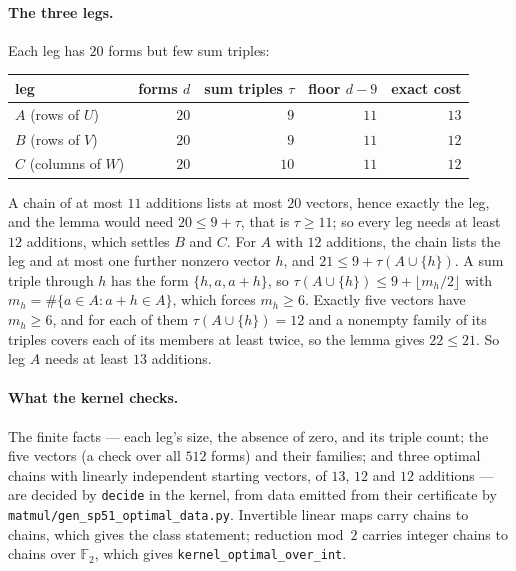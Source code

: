\documentclass[11pt]{article}
\theoremstyle{definition}
\theoremstyle{remark}
\newcommand{\F}{\mathbb{F}}
\begin{document}
\paragraph{The three legs.}  Each leg has $20$ forms but few sum
triples:

\begin{center}
\begin{tabular}{lrrrr}
\toprule
leg & forms $d$ & sum triples $\tau$ & floor $d-9$ & exact cost\\
\midrule
$A$ (rows of $U$) & $20$ & $9$ & $11$ & $13$\\
$B$ (rows of $V$) & $20$ & $9$ & $11$ & $12$\\
$C$ (columns of $W$) & $20$ & $10$ & $11$ & $12$\\
\bottomrule
\end{tabular}
\end{center}

\noindent
A chain of at most $11$ additions lists at most $20$ vectors, hence
exactly the leg, and the lemma would need $20\le 9+\tau$, that is
$\tau\ge 11$; so every leg needs at least $12$ additions, which settles
$B$ and $C$.  For $A$ with $12$ additions, the chain lists the leg and
at most one further nonzero vector $h$, and $21\le 9+\tau(A\cup\{h\})$.
A sum triple through $h$ has the form $\{h,a,a+h\}$, so
$\tau(A\cup\{h\}) \le 9 + \lfloor m_h/2\rfloor$ with
$m_h=\#\{a\in A : a+h\in A\}$, which forces $m_h\ge 6$.  Exactly five
vectors have $m_h\ge 6$, and for each of them $\tau(A\cup\{h\})=12$ and
a nonempty family of its triples covers each of its members at least
twice, so the lemma gives $22\le 21$.  So leg $A$ needs at least $13$ additions.

\paragraph{What the kernel checks.}  The finite facts --- each leg's
size, the absence of zero, and its triple count; the five vectors (a
check over all $512$ forms) and their families; and three optimal chains
with linearly independent starting vectors, of $13$, $12$ and $12$
additions --- are decided by \texttt{decide} in the kernel, from data
emitted from their certificate by \texttt{matmul/gen\_sp51\_optimal\_data.py}.
Invertible linear maps carry chains to chains, which gives the class
statement; reduction mod~$2$ carries integer chains to chains over
$\F_2$, which gives \texttt{kernel\_optimal\_over\_int}.
\end{document}
